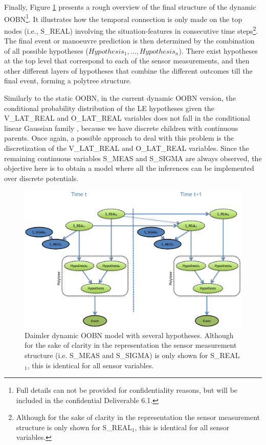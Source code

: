 Finally, Figure \ref{Figure:daimlerLEdynGeneric} presents a rough overview of the final structure of the dynamic OOBN\footnote{Full details can not be provided for confidentiality reasons, but will be included in the confidential Deliverable 6.1.}. It illustrates how the temporal connection is only made on the top nodes (i.e., S\_REAL) involving the situation-features in consecutive time steps\footnote{Although for the sake of clarity in the representation the sensor measurement structure is only shown for S\_REAL$_1$, this is identical for all sensor variables.}. The final event or manoeuvre prediction is then determined by the combination of all possible hypotheses ($Hypothesis_1, \ldots, Hypothesis_n$). There exist hypotheses at the top level that correspond to each of the sensor measurements, and then other different layers of hypotheses that combine the different outcomes till the final event, forming a polytree structure. %

Similarly to the static OOBN, in the current dynamic OOBN version, the conditional probability distribution of the LE hypotheses given the V\_LAT\_REAL and O\_LAT\_REAL variables does not fall in the conditional linear Gaussian family \cite{JensenNielsen2007}, because we have discrete children with continuous parents. Once again, a possible approach to deal with this problem is the discretization of the V\_LAT\_REAL and O\_LAT\_REAL variables. Since the remaining continuous variables S\_MEAS and S\_SIGMA are always observed, the objective here is to obtain a model where all the inferences can be implemented over discrete potentials.

\begin{figure}[ht!]
\begin{center}
\includegraphics[scale=0.39]{./figures/DaimlerLEdynGeneric}
\end{center}
\caption{\label{Figure:daimlerLEdynGeneric}Daimler dynamic OOBN model with several hypotheses. Although for the sake of clarity in the representation the sensor measurement structure (i.e. S\_MEAS and S\_SIGMA) is only shown for S\_REAL$_1$, this is identical for all sensor variables.}
\end{figure}

